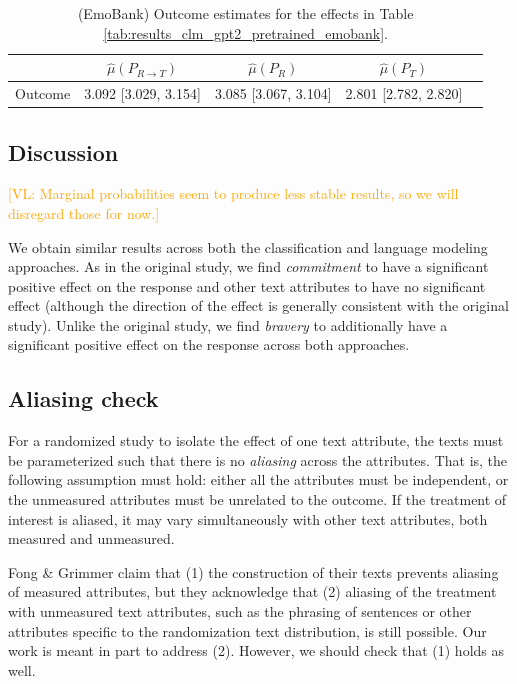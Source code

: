 \documentclass{article}
\newcommand{\vl}[1]{\textcolor{orange}{[VL: #1]}}
\begin{document}
\begin{table}[!ht]
\centering
\begin{tabular}{c|cccc}
\toprule
    & $\hat{\mu}(P_{R \rightarrow T})$   & $\hat{\mu}(P_R)$     & $\hat{\mu}(P_T)$     \\
\midrule
    Outcome & 3.092 [3.029, 3.154]               & 3.085 [3.067, 3.104] & 2.801 [2.782, 2.820] \\
\bottomrule
\end{tabular}
\caption{(EmoBank) Outcome estimates for the effects in Table \ref{tab:results_clm_gpt2_pretrained_emobank}.}
\label{tab:results_clm_gpt2_pretrained_emobank_outcome}
\end{table}

\newpage
\subsection{Discussion}

\vl{Marginal probabilities seem to produce less stable results, so we will disregard those for now.}

We obtain similar results across both the classification and language modeling approaches.  As in the original study, we find \textit{commitment} to have a significant positive effect on the response and other text attributes to have no significant effect (although the direction of the effect is generally consistent with the original study). Unlike the original study, we find \textit{bravery} to additionally have a significant positive effect on the response across both approaches.

\subsection{Aliasing check}

For a randomized study to isolate the effect of one text attribute, the texts must be parameterized such that there is no \textit{aliasing} across the attributes. That is, the following assumption must hold: either all the attributes must be independent, or the unmeasured attributes must be unrelated to the outcome. If the treatment of interest is aliased, it may vary simultaneously with other text attributes, both measured and unmeasured.

Fong \& Grimmer claim that (1) the construction of their texts prevents aliasing of measured attributes, but they acknowledge that (2) aliasing of the treatment with unmeasured text attributes, such as the phrasing of sentences or other attributes specific to the randomization text distribution, is still possible. Our work is meant in part to address (2). However, we should check that (1) holds as well. 
\end{document}
